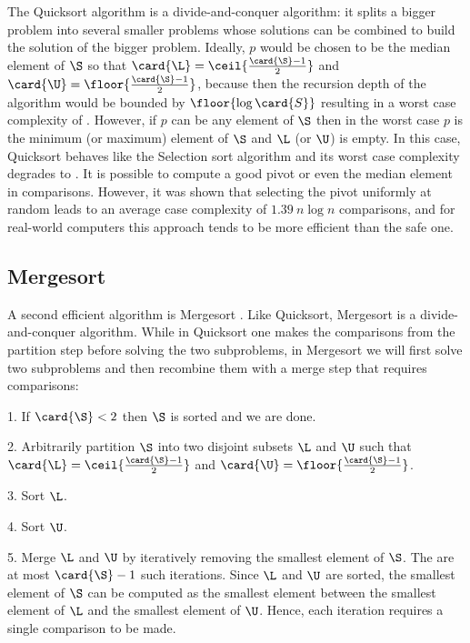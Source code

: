 The Quicksort algorithm is a divide-and-conquer algorithm: it splits a
bigger problem into several smaller problems whose solutions can be combined
to build the solution of the bigger problem. Ideally, \(p\) would be chosen to
be the median element of \(\S\) so that \(\card{\L} =
\ceil{\frac{\card{\S}-1}{2}}\) and \(\card{\U} =
\floor{\frac{\card{\S}-1}{2}}\), because then the recursion depth of the
algorithm would be bounded by \(\floor{\log \card{S}}\) resulting in a worst
case complexity of . However, if \(p\) can be any element of
\(\S\) then in the worst case \(p\) is the minimum (or maximum) element of
\(\S\) and \(\L\) (or \(\U\)) is empty. In this case, Quicksort behaves like
the Selection sort algorithm and its worst case complexity degrades to
. It is possible \cite{blum:1973} to compute a good pivot or even the
median element in  comparisons. However, it was shown \cite{hoare:1962} that
selecting the pivot uniformly at random leads to an average case complexity of
\(1.39~n \log n\) comparisons, and for real-world computers this approach tends
to be more efficient than the safe one.

\subsection*{Mergesort}

A second efficient algorithm is Mergesort
\cite{goldstine:1948,leiserson:2001}. Like Quicksort, Mergesort is a
divide-and-conquer algorithm. While in Quicksort one makes the comparisons from
the partition step before solving the two subproblems, in Mergesort we will
first solve two subproblems and then recombine them with a merge step that
requires  comparisons:

\begin{algorithm}
\item[1.] If \(\card{\S} < 2\) then \(\S\) is sorted and we are done.
\item[2.] Arbitrarily partition \(\S\) into two disjoint subsets \(\L\) and
\(\U\) such that \(\card{\L} = \ceil{\frac{\card{\S}-1}{2}}\) and \(\card{\U} =
\floor{\frac{\card{\S}-1}{2}}\).
\item[3.] Sort \(\L\).
\item[4.] Sort \(\U\).
\item[5.] Merge \(\L\) and \(\U\) by iteratively removing the smallest element
of \(\S\). The are at most \(\card{\S} - 1\) such iterations. Since \(\L\) and
\(\U\) are sorted, the smallest element of \(\S\) can be computed as the
smallest element between the smallest element of \(\L\) and the smallest
element of \(\U\). Hence, each iteration requires a single comparison to be made.
\end{algorithm}

